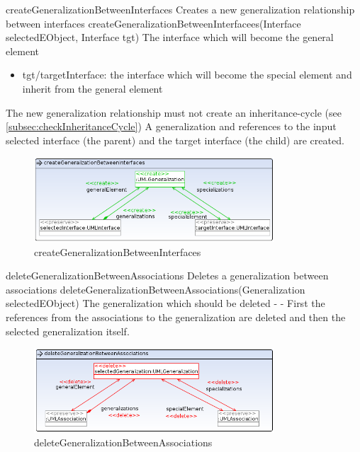 \op
{createGeneralizationBetweenInterfaces}
{Creates a new generalization relationship between interfaces}
{createGeneralizationBetweenInterfacees(Interface selectedEObject,
Interface tgt)}
{The interface which will become the general element}
{
\begin{itemize}
 \item tgt/targetInterface: the interface which will become the special
 element and inherit from the general element
\end{itemize}
}
{The new generalization relationship must not create an inheritance-cycle (see
\ref{subsec:checkInheritanceCycle})}
{A generalization and references to the input selected interface
(the parent) and the target interface (the child) are created.}
\begin{figure}[H]
  \centering
  \includegraphics[width=0.8\textwidth]{pics/createGeneralizationBetweenInterfaces.png}
  \caption{createGeneralizationBetweenInterfaces}
  \label{createGeneralizationBetweenInterfaces}
\end{figure}
\op
{deleteGeneralizationBetweenAssociations}
{Deletes a generalization between associations}
{deleteGeneralizationBetweenAssociations(Generalization selectedEObject)}
{The generalization which should be deleted}
{-}
{-}
{First the references from the associations to the generalization are deleted
and then the selected generalization itself.} \begin{figure}[H]
  \centering
  \includegraphics[width=0.8\textwidth]{pics/deleteGeneralizationBetweenAssociations.png}
  \caption{deleteGeneralizationBetweenAssociations}
  \label{deleteGeneralizationBetweenAssociations}
\end{figure}
